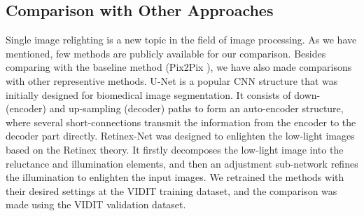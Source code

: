 \documentclass[runningheads]{llncs}
\begin{document}
\baselineskip 
\subsection{Comparison with Other Approaches}
\baselineskip 
Single image relighting is a new topic in the field of image processing. As we have mentioned, few methods are publicly available for our comparison. Besides comparing with the baseline method (Pix2Pix \cite{pix2pix}), we have also made comparisons with other representive methods.  U-Net \cite{UNet} is a popular CNN structure that was initially designed for biomedical image segmentation. It consists of down- (encoder) and up-sampling (decoder) paths to form an auto-encoder structure, where several short-connections transmit the information from the encoder to the decoder part directly. Retinex-Net \cite{RetinexNet} was designed to enlighten the low-light images based on the Retinex theory. It firstly decomposes the low-light image into the reluctance and illumination elements, and then an adjustment sub-network refines the illumination to enlighten the input images. We retrained the methods with their desired settings at the VIDIT \cite{helou2020vidit} training dataset, and the comparison was made using the VIDIT validation dataset. 


\begin{table}
\baselineskip 
\caption{Comparison among different approaches}
\baselineskip 
\label{Tab2}
\begin{center}
\begin{small}
\end{small}
\end{center}
\baselineskip 
\end{table}
\end{document}
